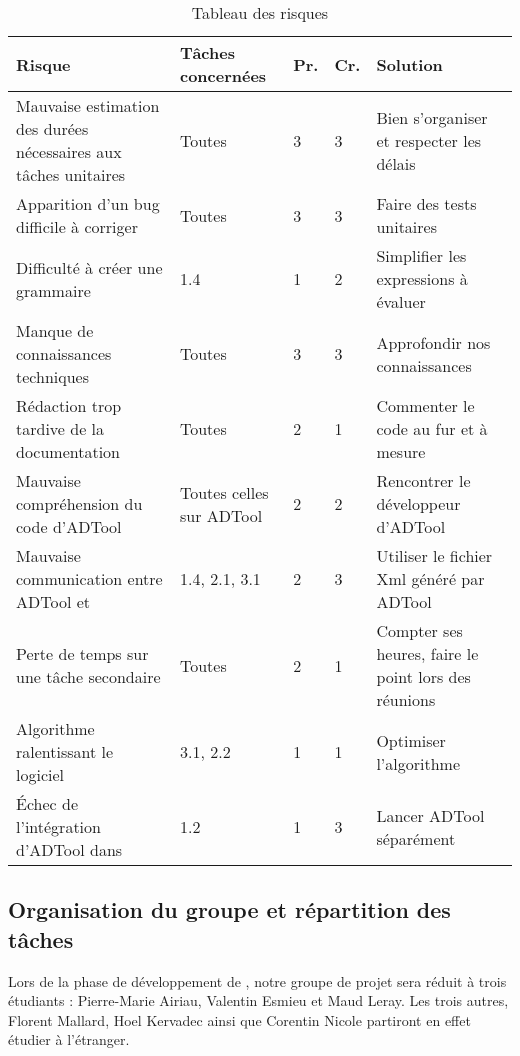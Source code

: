	\begin{table}[H]
		\centering
		\begin{tabular}{|p{4cm}|l|l|l|p{4cm}|}
		\hline
            \textbf{Risque} & \textbf{Tâches concernées} & \textbf{Pr.} & \textbf{Cr.} & \textbf{Solution}\\
            \hline
            Mauvaise estimation des durées nécessaires aux tâches unitaires & 
                Toutes & 3 & 3 &
                Bien s'organiser et respecter les délais\\ 
            \hline
            Apparition d'un bug difficile à corriger & 
                Toutes & 3 & 3 &
                Faire des tests unitaires\\
            \hline
            Difficulté à créer une grammaire & 
                1.4 & 1 & 2 &
                Simplifier les expressions à évaluer\\ 
            \hline
            Manque de connaissances techniques & 
                Toutes & 3 & 3 &
                Approfondir nos connaissances\\ 
            \hline
            Rédaction trop tardive de la documentation & 
                Toutes & 2 & 1 &
                Commenter le code au fur et à mesure\\
            \hline
            Mauvaise compréhension du code d'ADTool & 
                Toutes celles sur ADTool & 2 & 2 &
                Rencontrer le développeur d'ADTool\\ 
            \hline
            Mauvaise communication entre ADTool et \glasir{} & 
                1.4, 2.1, 3.1 & 2 & 3 &
                Utiliser le fichier Xml généré par ADTool\\ 
            \hline
            Perte de temps sur une tâche secondaire & 
                Toutes & 2 & 1 &
                Compter ses heures, faire le point lors des réunions\\ 
            \hline
            Algorithme ralentissant le logiciel & 
                3.1, 2.2 & 1 & 1 &
                Optimiser l’algorithme\\ 
            \hline
            Échec de l'intégration d'ADTool dans \glasir{} & 
                1.2 & 1 & 3 &
                Lancer ADTool séparément\\ 
            \hline
		\end{tabular}
		\caption{Tableau des risques}
		\label{fig:risques}
	\end{table}
	
	\subsection{Organisation du groupe et répartition des tâches}
		Lors de la phase de développement de \glasir{}, notre groupe de projet sera réduit à trois étudiants : Pierre-Marie {\sc Airiau}, Valentin {\sc Esmieu} et Maud {\sc Leray}. Les trois autres, Florent {\sc Mallard}, Hoel {\sc Kervadec} ainsi que Corentin {\sc Nicole} partiront en effet étudier à l'étranger.
		
